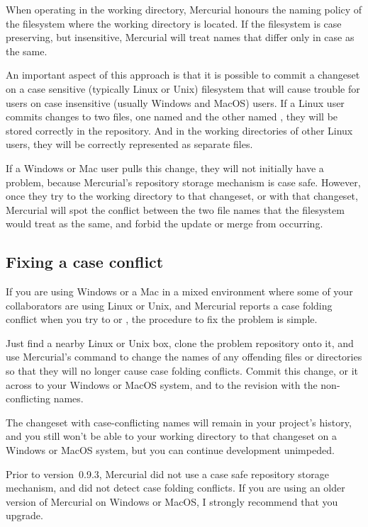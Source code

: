 When operating in the working directory, Mercurial honours the naming
policy of the filesystem where the working directory is located.  If
the filesystem is case preserving, but insensitive, Mercurial will
treat names that differ only in case as the same.

An important aspect of this approach is that it is possible to commit
a changeset on a case sensitive (typically Linux or Unix) filesystem
that will cause trouble for users on case insensitive (usually Windows
and MacOS) users.  If a Linux user commits changes to two files, one
named  and the other named ,
they will be stored correctly in the repository.  And in the working
directories of other Linux users, they will be correctly represented
as separate files.

If a Windows or Mac user pulls this change, they will not initially
have a problem, because Mercurial's repository storage mechanism is
case safe.  However, once they try to  the working
directory to that changeset, or  with that changeset,
Mercurial will spot the conflict between the two file names that the
filesystem would treat as the same, and forbid the update or merge
from occurring.

\subsection{Fixing a case conflict}

If you are using Windows or a Mac in a mixed environment where some of
your collaborators are using Linux or Unix, and Mercurial reports a
case folding conflict when you try to  or ,
the procedure to fix the problem is simple.

Just find a nearby Linux or Unix box, clone the problem repository
onto it, and use Mercurial's  command to change the
names of any offending files or directories so that they will no
longer cause case folding conflicts.  Commit this change, 
or  it across to your Windows or MacOS system, and
 to the revision with the non-conflicting names.

The changeset with case-conflicting names will remain in your
project's history, and you still won't be able to  your
working directory to that changeset on a Windows or MacOS system, but
you can continue development unimpeded.

\begin{note}
  Prior to version~0.9.3, Mercurial did not use a case safe repository
  storage mechanism, and did not detect case folding conflicts.  If
  you are using an older version of Mercurial on Windows or MacOS, I
  strongly recommend that you upgrade.
\end{note}

